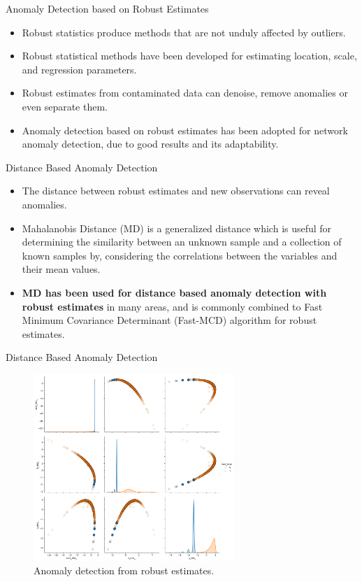 \documentclass[newPxFont, numfooter, sectionpages]{beamer}
\begin{document}
\begin{frame}[c]{Anomaly Detection based on Robust Estimates}	
	\begin{itemize}
		\item Robust statistics produce methods that are not unduly affected by outliers.
		\item Robust statistical methods have been developed for estimating location, scale, and regression parameters.
		\item Robust estimates from contaminated data can denoise, remove anomalies or even separate them.
		\item Anomaly detection based on robust estimates has been adopted for network anomaly detection, due to good results and its adaptability.
	\end{itemize}
\end{frame}

\begin{frame}[c]{Distance Based Anomaly Detection}	
	\begin{itemize}
		\item The distance between robust estimates and new observations can reveal anomalies.
		\item Mahalanobis Distance (MD) is a generalized distance which is useful for determining the similarity between an unknown sample and a collection of known samples by, considering the correlations between the variables and their mean values.
		\item \textbf{MD has been used for distance based anomaly detection with robust estimates} in many areas, and is commonly combined to Fast Minimum Covariance Determinant (Fast-MCD) algorithm \cite{rousseeuw1999fast} for robust estimates.
	\end{itemize}
\end{frame}

\begin{frame}[c]{Distance Based Anomaly Detection}
	\begin{figure}[h!]
	     \centering
	     \includegraphics[width=7.6cm]{figures/17_1s_distances.png}
	     \caption{Anomaly detection from robust estimates.}
	     \label{fig:fig03}
	\end{figure}
\end{frame}
\end{document}

